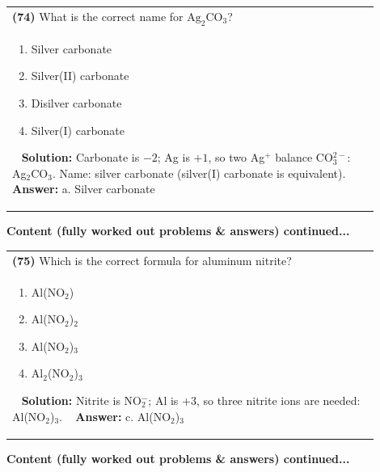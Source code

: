 \documentclass{article}
\begin{document}
\begin{tabular}{|p{0.9\linewidth}|}
\hline
\vspace{0.2cm}
\textbf{(74)} What is the correct name for $\text{Ag}_2\text{CO}_3$? \\
\begin{minipage}[t]{0.85\linewidth}
\begin{enumerate}[label=\alph*.]
\item Silver carbonate \
\item Silver(II) carbonate \
\item Disilver carbonate \
\item Silver(I) carbonate
\end{enumerate}
\end{minipage}\
\hline
\vspace{0.2cm}
\textbf{Solution:} Carbonate is $-2$; Ag is $+1$, so two Ag$^+$ balance CO$_3^{2-}$: Ag$_2$CO$_3$. Name: silver carbonate (silver(I) carbonate is equivalent). \
\hline
\vspace{0.2cm}
\textbf{Answer:} a. Silver carbonate \
\hline
\end{tabular}
\newpage
\noindent
{\large\textbf{Content (fully worked out problems & answers) continued...}}\\[0.2em]
\begin{tabular}{|p{0.9\linewidth}|}
\hline
\vspace{0.2cm}
\textbf{(75)} Which is the correct formula for aluminum nitrite? \\
\begin{minipage}[t]{0.85\linewidth}
\begin{enumerate}[label=\alph*.]
\item Al(NO$_2$) \
\item Al(NO$_2$)$_2$ \
\item Al(NO$_2$)$_3$ \
\item Al$_2$(NO$_2$)$_3$
\end{enumerate}
\end{minipage}\
\hline
\vspace{0.2cm}
\textbf{Solution:} Nitrite is NO$_2^-$; Al is +3, so three nitrite ions are needed: Al(NO$_2$)$_3$. \
\hline
\vspace{0.2cm}
\textbf{Answer:} c. Al(NO$_2$)$_3$ \
\hline
\end{tabular}

\newpage
\noindent
{\large\textbf{Content (fully worked out problems \& answers) continued...}}\\[0.2em]
\end{document}
